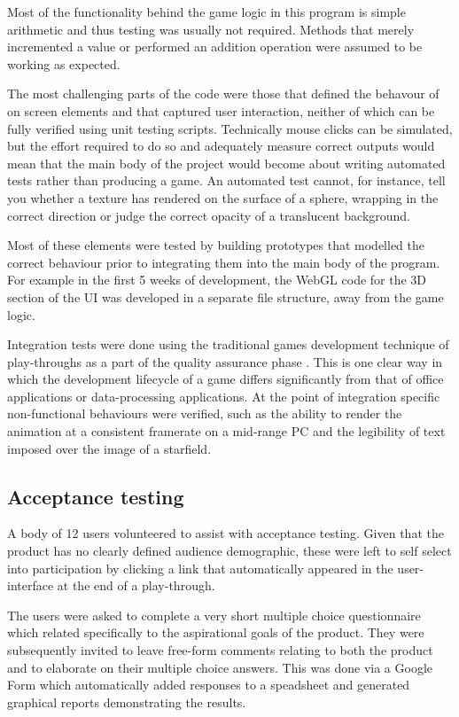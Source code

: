 \documentclass[twoside]{bhamthesis}
\begin{document}
Most of the functionality behind the game logic in this program is simple arithmetic and thus testing was usually not required. Methods that merely incremented a value or performed an addition operation were assumed to be working as expected.

The most challenging parts of the code were those that defined the behavour of on screen elements and that captured user interaction, neither of which can be fully verified using unit testing scripts. Technically mouse clicks can be simulated, but the effort required to do so and adequately measure correct outputs would mean that the main body of the project would become about writing automated tests rather than producing a game. An automated test cannot, for instance, tell you whether a texture has rendered on the surface of a sphere, wrapping in the correct direction or judge the correct opacity of a translucent background.

Most of these elements were tested by building prototypes that modelled the correct behaviour prior to integrating them into the main body of the program. For example in the first 5 weeks of development, the WebGL code for the 3D section of the UI was developed in a separate file structure, away from the game logic.

Integration tests were done using the traditional games development technique of play-throughs as a part of the quality assurance phase \cite{chandler_game_2009}. This is one clear way in which the development lifecycle of a game differs significantly from that of office applications or data-processing applications. At the point of integration specific non-functional behaviours were verified, such as the ability to render the animation at a consistent framerate on a mid-range PC and the legibility of text imposed over the image of a starfield.

\subsection{Acceptance testing}

A body of 12 users volunteered to assist with acceptance testing. Given that the product has no clearly defined audience demographic, these were left to self select into participation by clicking a link that automatically appeared in the user-interface at the end of a play-through.

The users were asked to complete a very short multiple choice questionnaire which related specifically to the aspirational goals of the product. They were subsequently invited to leave free-form comments relating to both the product and to elaborate on their multiple choice answers. This was done via a Google Form which automatically added responses to a speadsheet and generated graphical reports demonstrating the results.
\end{document}
